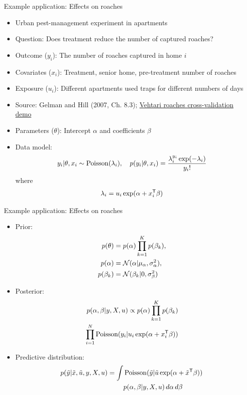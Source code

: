 \documentclass[10pt]{beamer}
\begin{document}
\begin{frame}{Example application: Effects on roaches}
\begin{itemize}
\item Urban pest-management experiment in apartments
\item Question: Does treatment reduce the number of captured roaches?
\pause
\item Outcome ($y_i$): The number of roaches captured in home $i$
\item Covariates ($x_i$): Treatment, senior home, pre-treatment number of roaches
\item Exposure ($u_i$): Different apartments used traps for different numbers of days
\item Source: Gelman and Hill (2007, Ch. 8.3); \href{https://avehtari.github.io/modelselection/roaches.html}{Vehtari roaches cross-validation demo}
\item Parameters ($\theta$): Intercept $\alpha$ and coefficients $\beta$
\pause
\item Data model:
\[
y_i|\theta,x_i \sim \operatorname{Poisson}(\lambda_i),
\quad
p(y_i|\theta,x_i) = \frac{\lambda_i^{y_i}\exp(-\lambda_i)}{y_i!}
\]
where
\[
\lambda_i = u_i\exp(\alpha + x_i^{\mathsf{T}}\beta)
\]
\end{itemize}
\end{frame}

\begin{frame}{Example application: Effects on roaches}
\begin{itemize}
\item Prior:
\[
\begin{aligned}
p(\theta) &= p(\alpha)\prod_{k=1}^K p(\beta_k),\\
p(\alpha) &= \mathcal{N}(\alpha|\mu_\alpha,\sigma_\alpha^2),\\
p(\beta_k) &= \mathcal{N}(\beta_k|0,\sigma_\beta^2)
\end{aligned}
\]
\pause
\item Posterior:
\begin{align*}
p(\alpha, \beta|y,X,u) \propto
p(\alpha)\prod_{k=1}^K p(\beta_k)\\
\prod_{i=1}^N \operatorname{Poisson}(y_i|u_i\exp(\alpha+x_i^{\mathsf{T}}\beta))
\end{align*}
\pause
\item Predictive distribution:
\begin{align*}
p(\tilde{y}|\tilde{x},\tilde{u},y,X,u) =
\int &\operatorname{Poisson}(\tilde{y}|\tilde{u}\exp(\alpha+\tilde{x}^{\mathsf{T}}\beta))\\
&p(\alpha,\beta|y,X,u)\,d\alpha\,d\beta
\end{align*}

\end{itemize}

\end{frame}
\end{document}
